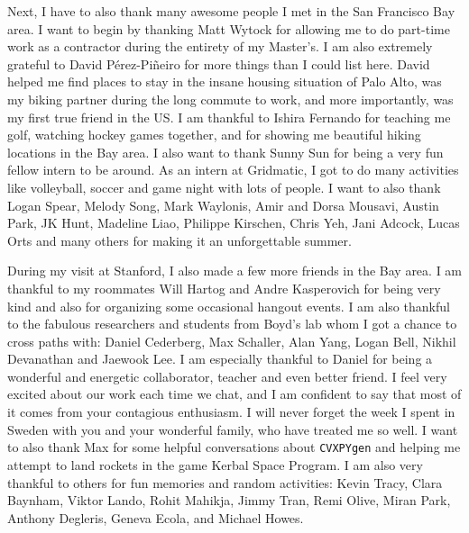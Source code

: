 Next, I have to also thank many awesome people I met in the San Francisco Bay area.
I want to begin by thanking Matt Wytock
for allowing me to do part-time work as a contractor during the entirety of my Master's.
I am also extremely grateful
to David Pérez-Piñeiro for more things than I could list here. David helped me find
places to stay in the insane housing situation of Palo Alto,
was my biking partner during the long commute to work, and more importantly, was my first
true friend in the US. I am thankful to Ishira Fernando for teaching me golf,
watching hockey games together, and for showing me beautiful hiking locations
in the Bay area.
I also want to thank Sunny Sun for being a very fun fellow intern to be around.
As an intern at Gridmatic, I got to do many activities like volleyball, soccer and
game night with lots of people.
I want to also thank Logan Spear, Melody Song, Mark Waylonis, Amir and
Dorsa Mousavi, Austin Park, JK Hunt, Madeline Liao, Philippe Kirschen, Chris Yeh,
Jani Adcock, Lucas Orts and many others for making it an unforgettable summer.

During my visit at Stanford, I also made a few more friends in the Bay area.
I am thankful to my roommates Will Hartog and Andre Kasperovich for being
very kind and also for organizing some occasional hangout events.
I am also thankful to the fabulous researchers and students
from Boyd's lab whom I got a chance to cross paths with: Daniel Cederberg,
Max Schaller, Alan Yang, Logan Bell, Nikhil Devanathan and Jaewook Lee.
I am especially thankful to Daniel for being a wonderful and energetic
collaborator, teacher and even better friend. I feel very excited
about our work each time we chat, and I am confident to say
that most of it comes from your contagious enthusiasm.
I will never forget the week I spent in Sweden with you
and your wonderful family, who have treated me so well.
I want to also thank Max for some helpful conversations
about \texttt{CVXPYgen} and helping me attempt to land rockets
in the game Kerbal Space Program.
I am also very thankful to others for fun memories and random activities:
Kevin Tracy, Clara Baynham, Viktor Lando, Rohit Mahikja, Jimmy Tran, Remi Olive,
Miran Park, Anthony Degleris, Geneva Ecola, and Michael Howes.

